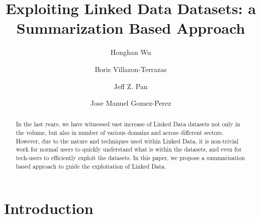 \documentclass{llncs}
\begin{document}
%
\frontmatter          %
%
\pagestyle{headings}  %
%
%
\mainmatter              %
%
\title{Exploiting Linked Data Datasets: a Summarization Based Approach}

%
%
\author{Honghan Wu \and Boris Villazon-Terrazas \and Jeff Z. Pan \and Jose Manuel Gomez-Perez}
%
%
%


\maketitle              %



\begin{abstract}
In the last years, we have witnessed vast increase of Linked Data datasets not only in the volume, but also in number of various domains and across different sectors. However, due to the nature and techniques used within Linked Data, it is non-trivial work for normal users to quickly understand what is within the datasets, and even for tech-users to efficiently exploit the datasets. In this paper, we propose a summarisation based approach to guide the exploitation of Linked Data. 
\end{abstract}

\section{Introduction}\label{sec:Introduction}

\end{document}
